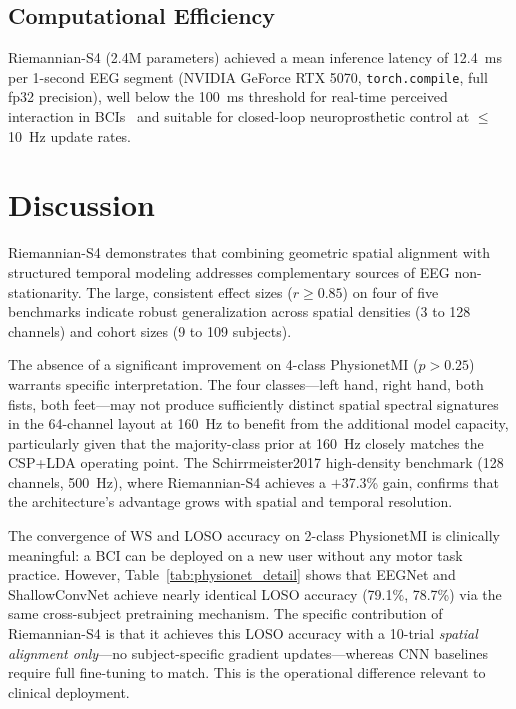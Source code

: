\documentclass[11pt,a4paper]{article}
\begin{document}
\subsection{Computational Efficiency}

Riemannian-S4 (2.4M parameters) achieved a mean inference latency of 12.4~ms
per 1-second EEG segment (NVIDIA GeForce RTX 5070, \texttt{torch.compile},
full fp32 precision), well below the 100~ms threshold for real-time perceived
interaction in BCIs~\cite{Lotte2018} and suitable for closed-loop
neuroprosthetic control at $\leq$10~Hz update rates.

\section{Discussion}

Riemannian-S4 demonstrates that combining geometric spatial alignment with
structured temporal modeling addresses complementary sources of EEG
non-stationarity.
The large, consistent effect sizes ($r \geq 0.85$) on four of five benchmarks
indicate robust generalization across spatial densities (3 to 128 channels) and
cohort sizes (9 to 109 subjects).

The absence of a significant improvement on 4-class PhysionetMI
($p > 0.25$) warrants specific interpretation.
The four classes---left hand, right hand, both fists, both feet---may not
produce sufficiently distinct spatial spectral signatures in the 64-channel
layout at 160~Hz to benefit from the additional model capacity, particularly
given that the majority-class prior at 160~Hz closely matches the CSP+LDA
operating point.
The Schirrmeister2017 high-density benchmark (128 channels, 500~Hz), where
Riemannian-S4 achieves a $+$37.3\% gain, confirms that the architecture's
advantage grows with spatial and temporal resolution.

The convergence of WS and LOSO accuracy on 2-class PhysionetMI is clinically
meaningful: a BCI can be deployed on a new user without any motor task
practice.
However, Table~\ref{tab:physionet_detail} shows that EEGNet and ShallowConvNet
achieve nearly identical LOSO accuracy (79.1\%, 78.7\%) via the same
cross-subject pretraining mechanism.
The specific contribution of Riemannian-S4 is that it achieves this LOSO
accuracy with a 10-trial \emph{spatial alignment only}---no subject-specific
gradient updates---whereas CNN baselines require full fine-tuning to match.
This is the operational difference relevant to clinical deployment.
\end{document}
